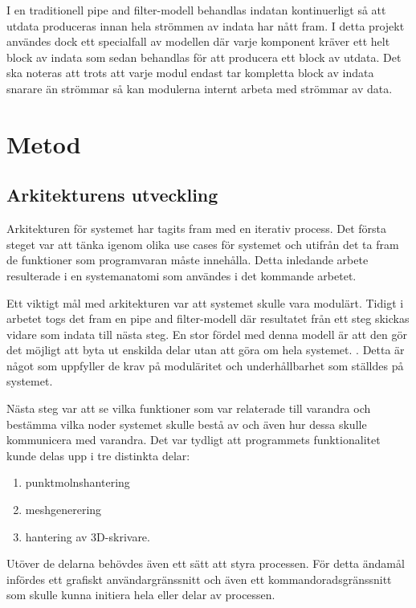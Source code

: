 I en traditionell pipe and filter-modell behandlas indatan kontinuerligt så att utdata produceras innan hela strömmen av indata har nått fram. I detta projekt användes dock ett specialfall av modellen där varje komponent kräver ett helt block av indata som sedan behandlas för att producera ett block av utdata. Det ska noteras att trots att varje modul endast tar kompletta block av indata snarare än strömmar så kan modulerna internt arbeta med strömmar av data.


\section{Metod}
\label{sec:method-lundberg}

\subsection{Arkitekturens utveckling}
Arkitekturen för systemet har tagits fram med en iterativ process. Det första steget var att tänka igenom olika use cases för systemet och utifrån det ta fram de funktioner som programvaran måste innehålla. Detta inledande arbete resulterade i en systemanatomi som användes i det kommande arbetet.

Ett viktigt mål med arkitekturen var att systemet skulle vara modulärt. Tidigt i arbetet togs det fram en pipe and filter-modell där resultatet från ett steg skickas vidare som indata till nästa steg. En stor fördel med denna modell är att den gör det möjligt att byta ut enskilda delar utan att göra om hela systemet. \cite{garlan1993introduction}. Detta är något som uppfyller de krav på moduläritet och underhållbarhet som ställdes på systemet.

Nästa steg var att se vilka funktioner som var relaterade till varandra och bestämma vilka noder systemet skulle bestå av och även hur dessa skulle kommunicera med varandra. Det var tydligt att programmets funktionalitet kunde delas upp i tre distinkta delar:

\begin{enumerate}
	\item punktmolnshantering
	
	\item meshgenerering
	
	\item hantering av 3D-skrivare.
\end{enumerate}

Utöver de delarna behövdes även ett sätt att styra processen. För detta ändamål infördes ett grafiskt användargränssnitt och även ett kommandoradsgränssnitt som skulle kunna initiera hela eller delar av processen.

